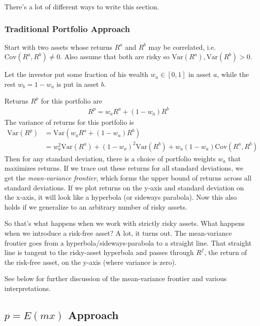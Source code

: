 \documentclass[12pt]{article}
\theoremstyle{plain}
\theoremstyle{definition}
\theoremstyle{remark}
\begin{document}
There's a lot of different ways to write this section.

\subsubsection{Traditional Portfolio Approach}

Start with two assets whose returns $R^a$ and $R^b$ may be correlated,
i.e. $\text{Cov}(R^a,R^b) \neq 0$. Also assume that both are risky so
$\text{Var}(R^a), \text{Var}(R^b)>0$.

Let the investor put some fraction of his wealth $w_a \in [0,1]$ in
asset $a$, while the rest $w_b = 1-w_a$ is put in asset $b$.

Returns $R^p$ for this portfolio are
\begin{align*}
  R^p = w_a R^a + (1-w_a) R^b
\end{align*}
The variance of returns for this portfolio is
\begin{align*}
  \text{Var}(R^p) &= \text{Var}(w_a R^a + (1-w_a)R^b) \\
  &= w_a^2 \text{Var}(R^a) + (1-w_a)^2\text{Var}(R^b)
    + w_a(1-w_a)\text{Cov}(R^a,R^b)
\end{align*}
Then for any standard deviation, there is a choice of portfolio weights
$w_a$ that maximizes returns. If we trace out these returns for all
standard deviations, we get the \emph{mean-variance frontier}, which
forms the upper bound of returns across all standard deviations. If we
plot returns on the y-axis and standard deviation on the x-axis, it will
look like a hyperbola (or sideways parabola).  Now this also holds if we
generalize to an arbitrary number of risky assets.

So that's what happens when we work with strictly risky assets. What
happens when we introduce a risk-free asset? A lot, it turns out. The
mean-variance frontier goes from a hyperbola/sideways-parabola to a
straight line.  That straight line is tangent to the risky-asset
hyperbola and passes through $R^f$, the return of the risk-free asset,
on the y-axis (where variance is zero).

See below for further discussion of the mean-variance frontier and
various interpretations.

\subsection{$p=E(mx)$ Approach}
\end{document}
